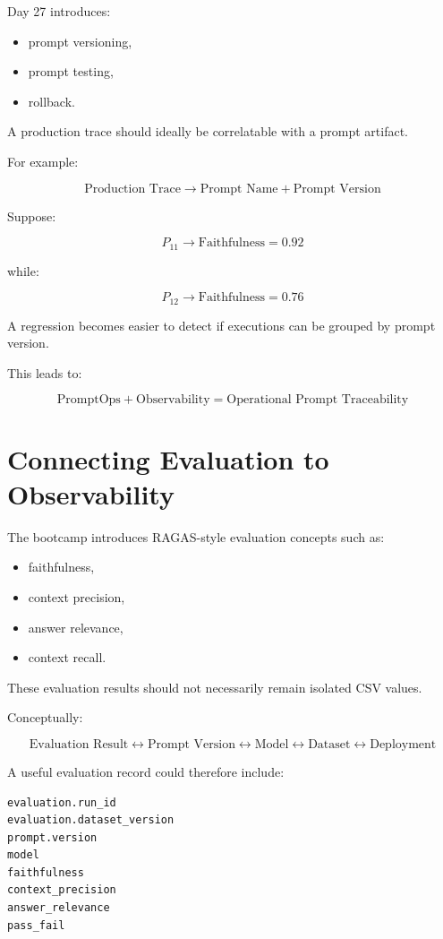 \documentclass[11pt,a4paper]{article}
\begin{document}
Day 27 introduces:

\begin{itemize}
\item prompt versioning,
\item prompt testing,
\item rollback.
\end{itemize}

A production trace should ideally be correlatable with a prompt artifact.

For example:

\[
\text{Production Trace} \rightarrow \text{Prompt Name} + \text{Prompt Version}
\]

Suppose:

\[
P_{11} \rightarrow \text{Faithfulness}=0.92
\]

while:

\[
P_{12} \rightarrow \text{Faithfulness}=0.76
\]

A regression becomes easier to detect if executions can be grouped by prompt version.

This leads to:

\[
\boxed{
\text{PromptOps} + \text{Observability} = \text{Operational Prompt Traceability}
}
\]

\section{Connecting Evaluation to Observability}

The bootcamp introduces RAGAS-style evaluation concepts such as:

\begin{itemize}
\item faithfulness,
\item context precision,
\item answer relevance,
\item context recall.
\end{itemize}

These evaluation results should not necessarily remain isolated CSV values.

Conceptually:

\[
\text{Evaluation Result} \leftrightarrow \text{Prompt Version} \leftrightarrow \text{Model} \leftrightarrow \text{Dataset} \leftrightarrow \text{Deployment}
\]

A useful evaluation record could therefore include:

\begin{lstlisting}
evaluation.run_id
evaluation.dataset_version
prompt.version
model
faithfulness
context_precision
answer_relevance
pass_fail
\end{lstlisting}
\end{document}
